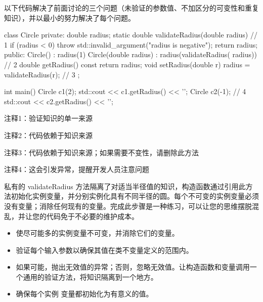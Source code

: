 以下代码解决了前面讨论的三个问题（未验证的参数值、不加区分的可变性和重复知识），并以最小的努力解决了每个问题。


\begin{cpp}
class Circle {
private:
  double radius;
  static double validateRadius(double radius) { // 1
    if (radius < 0)
      throw std::invalid_argument("radius is negative");
    return radius;
  }
public:
  Circle() : radius(1) {}
  Circle(double radius) : radius(validateRadius(
    radius)) {} // 2
  double getRadius() const { return radius; }
  void setRadius(double r) { radius =
  validateRadius(r); } // 3
};

int main() {
  Circle c1(2);
  std::cout << c1.getRadius() << '\n';
  Circle c2(-1); // 4
  std::cout << c2.getRadius() << '\n';
}
\end{cpp}

{\footnotesize
注释1：验证知识的单一来源

注释2：代码依赖于知识来源

注释3：代码依赖于知识来源；如果需要不变性，请删除此方法

注释4：这会引发异常，提醒开发人员注意问题
}

私有的 validateRadius 方法隔离了对适当半径值的知识，构造函数通过引用此方法初始化实例变量，并分别实例化具有不同半径的圆。每个不可变的实例变量必须没有变量；消除任何现有的变量。完成此步骤是一种练习，可以让您的思维摆脱混乱，并让您的代码免于不必要的维护成本。


\begin{itemize}
\item
使尽可能多的实例变量不可变，并消除它们的变量。

\item
验证每个输入参数以确保其值在类不变量定义的范围内。

\item
如果可能，抛出无效值的异常；否则，忽略无效值。让构造函数和变量调用一个通用的验证方法，将知识隔离到一个地方。

\item
确保每个实例 变量都初始化为有意义的值。
\end{itemize}


















